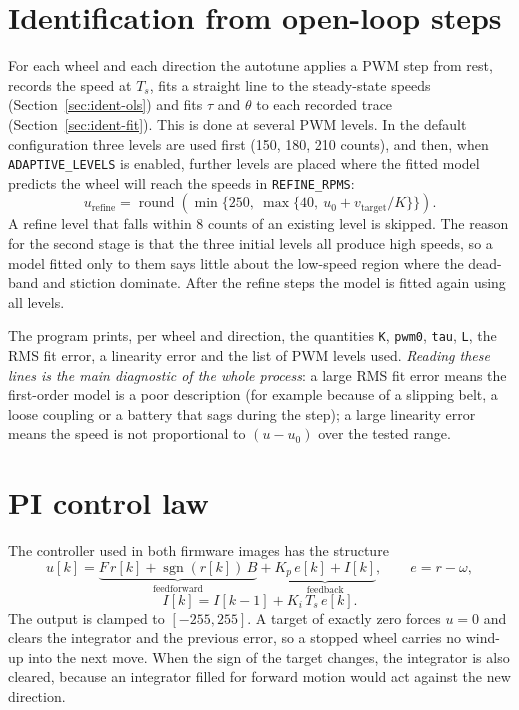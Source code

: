 \documentclass[11pt,a4paper]{report}
\newcommand{\code}[1]{\texttt{#1}}
\begin{document}
\section{Identification from open-loop steps}
For each wheel and each direction the autotune applies a PWM step from rest, records the speed at $T_s$, fits a straight line to the steady-state speeds (Section~\ref{sec:ident-ols}) and fits $\tau$ and $\theta$ to each recorded trace (Section~\ref{sec:ident-fit}). This is done at several PWM levels. In the default configuration three levels are used first (150, 180, 210 counts), and then, when \code{ADAPTIVE\_LEVELS} is enabled, further levels are placed where the fitted model predicts the wheel will reach the speeds in \code{REFINE\_RPMS}:
\begin{equation}
  u_{\text{refine}} = \operatorname{round}\!\left(\min\{250,\ \max\{40,\ u_0 + v_{\text{target}}/K\}\}\right). \label{eq:refine}
\end{equation}
A refine level that falls within 8 counts of an existing level is skipped. The reason for the second stage is that the three initial levels all produce high speeds, so a model fitted only to them says little about the low-speed region where the dead-band and stiction dominate. After the refine steps the model is fitted again using all levels.

The program prints, per wheel and direction, the quantities \code{K}, \code{pwm0}, \code{tau}, \code{L}, the RMS fit error, a linearity error and the list of PWM levels used. \emph{Reading these lines is the main diagnostic of the whole process}: a large RMS fit error means the first-order model is a poor description (for example because of a slipping belt, a loose coupling or a battery that sags during the step); a large linearity error means the speed is not proportional to $(u-u_0)$ over the tested range.

\section{PI control law}
The controller used in both firmware images has the structure
\begin{equation}
  u[k] = \underbrace{F\,r[k] + \operatorname{sgn}(r[k])\,B}_{\text{feedforward}}
       + \underbrace{K_p\,e[k] + I[k]}_{\text{feedback}},\qquad e = r - \omega, \label{eq:pi}
\end{equation}
\begin{equation}
  I[k] = I[k-1] + K_i\,T_s\,e[k]. \label{eq:integ}
\end{equation}
The output is clamped to $[-255,255]$. A target of exactly zero forces $u=0$ and clears the integrator and the previous error, so a stopped wheel carries no wind-up into the next move. When the sign of the target changes, the integrator is also cleared, because an integrator filled for forward motion would act against the new direction.
\end{document}
